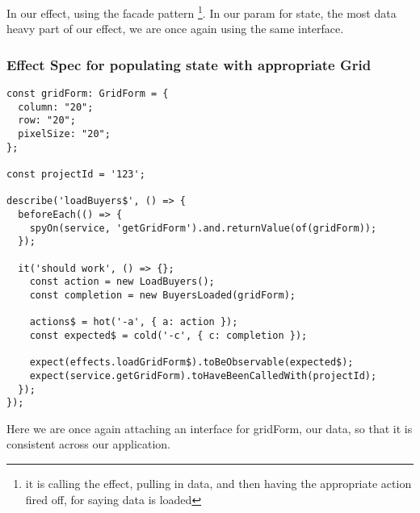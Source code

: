In our effect, using the facade pattern \footnote{it is calling the effect,
pulling in data, and then having the appropriate action fired off, for saying
data is loaded}. In our param for state, the most data heavy part of our effect,
we are once again using the same interface.

\subsubsection{ Effect Spec for populating state with appropriate Grid }
\begin{lstlisting}
const gridForm: GridForm = {
  column: "20";
  row: "20";
  pixelSize: "20";
};

const projectId = '123';

describe('loadBuyers$', () => {
  beforeEach(() => {
    spyOn(service, 'getGridForm').and.returnValue(of(gridForm));
  });

  it('should work', () => {};
    const action = new LoadBuyers();
    const completion = new BuyersLoaded(gridForm);

    actions$ = hot('-a', { a: action });
    const expected$ = cold('-c', { c: completion });

    expect(effects.loadGridForm$).toBeObservable(expected$);
    expect(service.getGridForm).toHaveBeenCalledWith(projectId);
  });
});
\end{lstlisting}

Here we are once again attaching an interface for gridForm, our data, so that it
is consistent across our application. 

